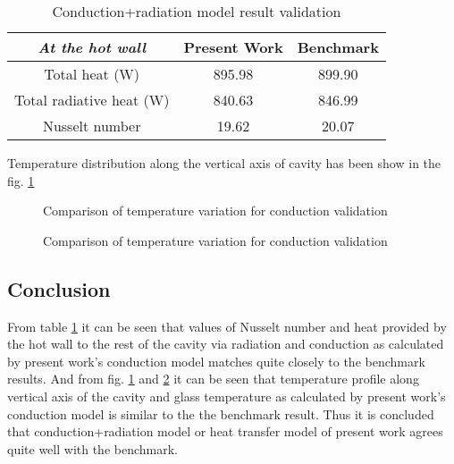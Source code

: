 \begin{table}[H]
\centering
\caption{Conduction+radiation model result validation}
\label{tab:conductionRadiationModelResultValidation}
\begin{tabular}{@{}|c|c|c|@{}}
\toprule
\textit{\textbf{At the hot wall}} & \textbf{Present Work} & \textbf{Benchmark} \\ \midrule
Total heat (W)                    & 895.98                & 899.90             \\ \midrule
Total radiative heat (W)          & 840.63                & 846.99             \\ \midrule
Nusselt number                    & 19.62                 & 20.07              \\ \bottomrule
\end{tabular}
\end{table}

Temperature distribution along the vertical axis of cavity has been show in the fig. \ref{fig:validationConductionRadiation}

\begin{figure}[H]
\centering     %
{}
\caption{Comparison of temperature variation for conduction validation}
\label{fig:validationConductionRadiation}
\end{figure}

\begin{figure}[H]
\centering     %
{}
\caption{Comparison of temperature variation for conduction validation}
\label{fig:validationConductionRadiationGlass}
\end{figure}

\subsection{Conclusion}

From table \ref{tab:conductionRadiationModelResultValidation} it can be seen that values of Nusselt number and heat provided by the hot wall to the rest of the cavity via radiation and conduction as calculated by present work's conduction model matches quite closely to the benchmark results. And from fig. \ref{fig:validationConductionRadiation} and \ref{fig:validationConductionRadiationGlass} it can be seen that temperature profile along vertical axis of the cavity and glass temperature as calculated by present work's conduction model is similar to the the benchmark result. Thus it is concluded that conduction+radiation model or heat transfer model of present work agrees quite well with the benchmark.

